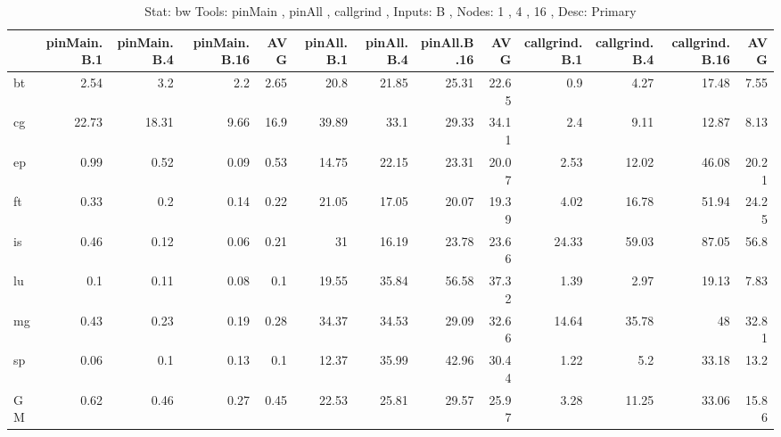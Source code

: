 \begin{table}[]
\caption{Stat: bw 
 Tools: pinMain , pinAll , callgrind ,  
 Inputs: B ,  
 Nodes: 1 , 4 , 16 ,  
 Desc: Primary}
\begin{center}
\begin{tabular}{lrrrrrrrrrrrr}
\hline
    &   pinMain.B.1 &   pinMain.B.4 &   pinMain.B.16 &   AVG &   pinAll.B.1 &   pinAll.B.4 &   pinAll.B.16 &   AVG &   callgrind.B.1 &   callgrind.B.4 &   callgrind.B.16 &   AVG \\
\hline
 bt &          2.54 &           3.2 &            2.2 &  2.65 &         20.8 &        21.85 &         25.31 & 22.65 &             0.9 &            4.27 &            17.48 &  7.55 \\
 cg &         22.73 &         18.31 &           9.66 &  16.9 &        39.89 &         33.1 &         29.33 & 34.11 &             2.4 &            9.11 &            12.87 &  8.13 \\
 ep &          0.99 &          0.52 &           0.09 &  0.53 &        14.75 &        22.15 &         23.31 & 20.07 &            2.53 &           12.02 &            46.08 & 20.21 \\
 ft &          0.33 &           0.2 &           0.14 &  0.22 &        21.05 &        17.05 &         20.07 & 19.39 &            4.02 &           16.78 &            51.94 & 24.25 \\
 is &          0.46 &          0.12 &           0.06 &  0.21 &           31 &        16.19 &         23.78 & 23.66 &           24.33 &           59.03 &            87.05 &  56.8 \\
 lu &           0.1 &          0.11 &           0.08 &   0.1 &        19.55 &        35.84 &         56.58 & 37.32 &            1.39 &            2.97 &            19.13 &  7.83 \\
 mg &          0.43 &          0.23 &           0.19 &  0.28 &        34.37 &        34.53 &         29.09 & 32.66 &           14.64 &           35.78 &               48 & 32.81 \\
 sp &          0.06 &           0.1 &           0.13 &   0.1 &        12.37 &        35.99 &         42.96 & 30.44 &            1.22 &             5.2 &            33.18 &  13.2 \\
 GM &          0.62 &          0.46 &           0.27 &  0.45 &        22.53 &        25.81 &         29.57 & 25.97 &            3.28 &           11.25 &            33.06 & 15.86 \\
\hline
\end{tabular}
\end{center}
\end{table}
